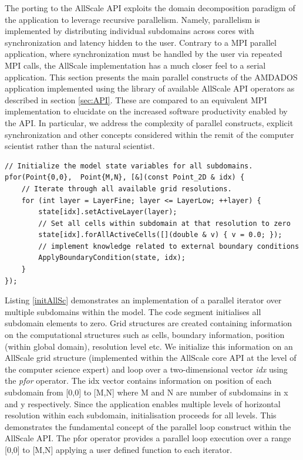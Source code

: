 \documentclass[conference,compsoc]{IEEEtran}
\begin{document}
The porting to the AllScale API exploits the domain decomposition paradigm of the application to leverage recursive parallelism. Namely, parallelism is implemented by distributing individual subdomains across cores with synchronization and latency hidden to the user. Contrary to a MPI parallel application, where synchronization must be handled by the user via repeated MPI calls, the AllScale implementation has a much closer feel to a serial application. This section presents the main parallel constructs of the AMDADOS application implemented using the library of available AllScale API operators as described in section \ref{sec:API}. These are compared to an equivalent MPI implementation to elucidate on the increased software productivity enabled by the API. In particular, we address the complexity of parallel constructs, explicit synchronization and other concepts considered within the remit of the computer scientist rather than the natural scientist.


\begin{lstlisting}[caption=Sample code to initialize concentrations on all subdomains to zero by means of a parallel loop construct using the pfor operator
, label=initAllSc]
// Initialize the model state variables for all subdomains.
pfor(Point{0,0},  Point{M,N}, [&](const Point_2D & idx) {
    // Iterate through all available grid resolutions.
    for (int layer = LayerFine; layer <= LayerLow; ++layer) {
        state[idx].setActiveLayer(layer);
        // Set all cells within subdomain at that resolution to zero
        state[idx].forAllActiveCells([](double & v) { v = 0.0; });
        // implement knowledge related to external boundary conditions
        ApplyBoundaryCondition(state, idx);
    }
});
\end{lstlisting}


Listing \ref{initAllSc} demonstrates an implementation of a parallel iterator over multiple subdomains within the model. The code segment initialises all subdomain elements to zero. Grid structures are created containing information on the computational structures such as cells, boundary information, position (within global domain), resolution level etc. We initialize this information on an AllScale grid structure (implemented within the AllScale core API at the level of the computer science expert) and loop over a two-dimensional vector \textit{idx} using the \textit{pfor} operator. The idx vector contains information on position of each subdomain from [0,0] to [M,N] where M and N are number of subdomains in x and y respectively. Since the application enables multiple levels of horizontal resolution within each subdomain, initialisation proceeds for all levels. This demonstrates the fundamental concept of the parallel loop construct within the AllScale API. The pfor operator provides a parallel loop execution over a range [0,0] to [M,N] applying a user defined function to each iterator.
\end{document}

